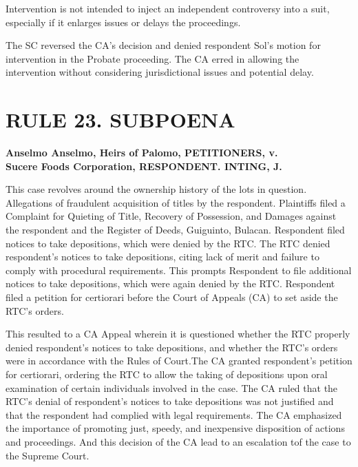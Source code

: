 \documentclass[
12pt,
oneside,
onehalfspacing,
headsepline
]{DigestCollection}
\begin{document}
Intervention is not intended to inject an independent controversy into a suit, especially if it enlarges issues or delays the proceedings.

The SC reversed the CA's decision and denied respondent Sol's motion for intervention in the Probate proceeding. The CA erred in allowing the intervention without considering jurisdictional issues and potential delay.

\chapter{RULE 23. SUBPOENA }
\label{ce9030e0-0a12-11ef-932c-63c852f65e48}


\label{041abb70-0a10-11ef-932c-63c852f65e48}


\noindent\textbf{Anselmo Anselmo, Heirs of Palomo, PETITIONERS, v. \\Sucere Foods Corporation, RESPONDENT. INTING, J.}\vspace{0.4cm}

This case revolves around the ownership history of the lots in question. Allegations of fraudulent acquisition of titles by the respondent. Plaintiffs filed a Complaint for Quieting of Title, Recovery of Possession, and Damages against the respondent and the Register of Deeds, Guiguinto, Bulacan. Respondent filed notices to take depositions, which were denied by the RTC. The RTC denied respondent's notices to take depositions, citing lack of merit and failure to comply with procedural requirements. This prompts Respondent to file additional notices to take depositions, which were again denied by the RTC. Respondent filed a petition for certiorari before the Court of Appeals (CA) to set aside the RTC's orders.

This resulted to a CA Appeal wherein it is questioned whether the RTC properly denied respondent's notices to take depositions, and whether the RTC's orders were in accordance with the Rules of Court.The CA granted respondent's petition for certiorari, ordering the RTC to allow the taking of depositions upon oral examination of certain individuals involved in the case. The CA ruled that the RTC's denial of respondent's notices to take depositions was not justified and that the respondent had complied with legal requirements. The CA emphasized the importance of promoting just, speedy, and inexpensive disposition of actions and proceedings. And this decision of the CA lead to an escalation tof the case to the Supreme Court.
\end{document}

